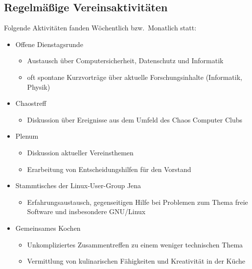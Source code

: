 \documentclass[10pt, a4paper]{scrartcl}
\begin{document}
\subsection*{Regelmäßige Vereinsaktivitäten}
Folgende Aktivitäten fanden Wöchentlich bzw.\ Monatlich statt:
\begin{itemize}
	\item Offene Dienstagsrunde
		\begin{itemize}
			\item Austausch über Computersicherheit, Datenschutz und Informatik
			\item oft spontane Kurzvorträge über aktuelle Forschungsinhalte (Informatik, Physik)
		\end{itemize}
	\item Chaostreff
		\begin{itemize}
			\item Diskussion über Ereignisse aus dem Umfeld des Chaos Computer Clubs
		\end{itemize}
	\item Plenum
		\begin{itemize}
			\item Diskussion aktueller Vereinsthemen
			\item Erarbeitung von Entscheidungshilfen für den Vorstand
		\end{itemize}
	\item Stammtisches der Linux-User-Group Jena
		\begin{itemize}
			\item Erfahrungsaustausch, gegenseitigen Hilfe bei Problemen zum Thema freie Software und insbesondere GNU/Linux
		\end{itemize}
	\item Gemeinsames Kochen
		\begin{itemize}
			\item Unkompliziertes Zusammentreffen zu einem weniger technischen Thema
			\item Vermittlung von kulinarischen Fähigkeiten und Kreativität in der Küche
		\end{itemize}
\end{itemize}
\end{document}
